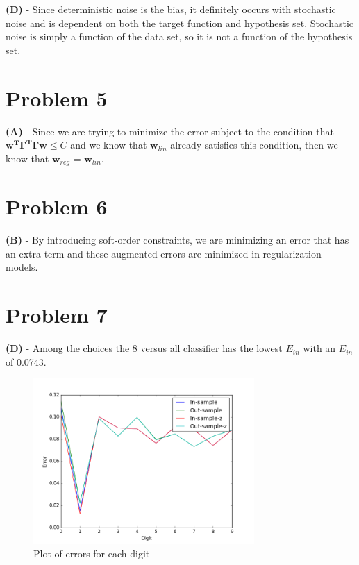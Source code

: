 \documentclass[10pt,letter]{article}
\begin{document}
\textbf{(D)} - Since deterministic noise is the bias, it definitely occurs with stochastic noise and is dependent on both the target function and hypothesis set. Stochastic noise is simply a function of the data set, so it is not a function of the hypothesis set. 

\section*{Problem 5}

\textbf{(A)} - Since we are trying to minimize the error subject to the condition that $\mathbf{w^T \Gamma ^T \Gamma  w} \leq C$ and we know that $\mathbf{w}_{lin}$ already satisfies this condition, then we know that $\mathbf{w}_{reg}$ = $\mathbf{w}_{lin}$.

\section*{Problem 6}

\textbf{(B)} - By introducing soft-order constraints, we are minimizing an error that has an extra term and these augmented errors are minimized in regularization models.

\section*{Problem 7}

\textbf{(D)} - Among the choices the 8 versus all classifier has the lowest $E_{in}$ with an $E_{in}$ of 0.0743.

\begin{figure}[H]
\begin{center}
\includegraphics[width=0.75\textwidth]{p7.png}
\caption{Plot of errors for each digit}
\end{center}
\end{figure}
\end{document}
